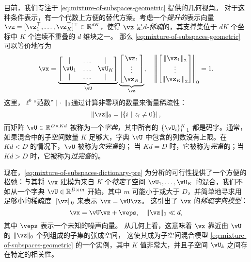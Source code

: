\documentclass[../../book-main.tex]{subfiles}
\begin{document}
目前，我们专注于 \eqref{eq:mixture-of-subspaces-geometric} 提供的几何视角。
对于这种条件表示，有一个代数上方便的替代方案。考虑一个\textit{提升的}表示向量 $\vz = [\vz_1^\top, \dots, \vz_K^\top]^\top \in \R^{dK}$，使得 $\vz$ 是\textit{$d$-稀疏}的，其支撑集位于 $dK$ 个坐标中 $K$ 个连续不重叠的 $d$ 维块之一。
那么 \eqref{eq:mixture-of-subspaces-geometric} 可以等价地写为
\begin{equation}\label{eq:mixture-of-subspaces-dictionary-pre}
    \vx = 
    \underbrace{
    \begin{bmatrix} 
    | & \hdots & |  \\
    \vU_1 & \hdots & \vU_K  \\
    | & \hdots & | 
    \end{bmatrix} 
    }_{\vU}
    \underbrace{
    \begin{bmatrix} \vz_1 \\ \vdots \\ \vz_K \end{bmatrix}
    }_{\vz},
    \quad
    \norm*{
    \begin{bmatrix} \norm*{\vz_1}_2 \\ \vdots \\ \norm*{\vz_K}_2 \end{bmatrix}
    }_0 = 1.
\end{equation}
这里，$\ell^0$“范数”$\norm{\,\cdot\,}_0$通过计算非零项的数量来衡量稀疏性：
\begin{equation}\label{eq:ell-zero-norm}
    \norm{\vz}_0 = \abs*{\set{i \given z_i \neq 0}},
\end{equation}
而矩阵 $\vU \in \R^{D \times Kd}$ 被称为一个\textit{字典}，其中所有的 $\{\vU_i\}_{i=1}^K$ 都是码字。通常，如果混合中的子空间数量 $K$ 足够大，字典 $\vU$ 中包含的列数没有上限。在 $Kd < D$ 的情况下，$\vU$ 被称为\textit{欠完备}的；
当 $Kd = D$ 时，它被称为\textit{完备}的；当 $Kd > D$ 时，它被称为\textit{过完备}的。

现在，\eqref{eq:mixture-of-subspaces-dictionary-pre} 为分析的可行性提供了一个方便的松弛：与其将 $\vx$ 建模为来自 $K$ 个\textit{特定}子空间 $\vU_1, \dots, \vU_K$ 的混合，我们不如从一个字典 $\vU \in \R^{D \times m}$ 开始，其中 $m$ 可能小于或大于 $D$，并简单地寻求用足够小的稀疏度 $\norm{\vz}_0$ 来表示 $\vx = \vU \vz$。
这引出了 $\vx$ 的\textit{稀疏字典模型}：
\begin{equation}\label{eq:mixture-of-subspaces-dictionary}
    \vx =  \vU \vz + \veps,
    \quad
    \norm{\vz}_0 \ll d,
\end{equation}
其中 $\veps$ 表示一个未知的噪声向量。
从几何上看，这意味着 $\vx$ 靠近由 $\vU$ 的 $\norm{\vz}_0$ 个列组成的子集的张成空间，
这使其成为子空间混合模型 \eqref{eq:mixture-of-subspaces-geometric} 的一个实例，其中 $K$ 值非常大，并且子空间 $\vU_k$ 之间存在特定的相关性。
\end{document}
